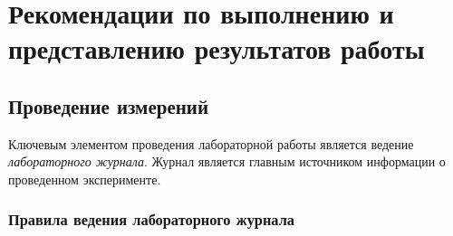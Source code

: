 \chapter{Рекомендации по выполнению и представлению результатов работы}

\section{Проведение измерений}

Ключевым элементом проведения лабораторной работы является ведение \emph{лабораторного
журнала}. Журнал является главным источником информации о проведенном
эксперименте.

\subsection{Правила ведения лабораторного журнала}
\label{sec:journal}


